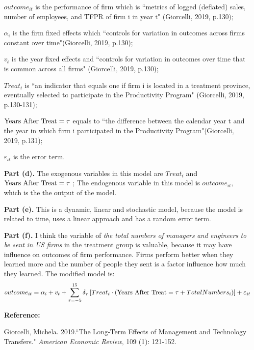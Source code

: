 \documentclass[letterpaper,12pt]{article}
\theoremstyle{definition}
\begin{document}
$outcome_{it}$ is the performance of firm which is ``metrics of logged (deflated) sales, number of employees, and TFPR of firm i in year t" (Giorcelli, 2019, p.130); 

$\alpha_{i} $ is the firm fixed effects which ``controls for variation in outcomes across firms constant over time"(Giorcelli, 2019, p.130); 

$ v_{t}$ is the year fixed effects and ``controls for variation in outcomes over time that is common across all firms" (Giorcelli, 2019, p.130); 

$Treat_{i}$ is ``an indicator that equals one if firm i is located in a treatment province, eventually selected to participate in the Productivity Program" (Giorcelli, 2019, p.130-131); 

$\textup{Years After Treat} = \tau$ equals to ``the difference between the calendar year t and the year in which firm i participated in the Productivity Program"(Giorcelli, 2019, p.131); 

$\varepsilon_{it}$ is the error term.

\textbf{Part (d).} The exogenous variables in this model are $Treat_{i}$  and $ \textup{Years After Treat} = \tau $  ; The endogenous variable in this model is $outcome_{it}$, which is the the output of the model.

\textbf{Part (e).} This is a dynamic, linear and stochastic model, because the model is related to time, uses a linear approach and has a random error term.

\textbf{Part (f).} I think the variable of \emph{the total numbers of managers and engineers to be sent in US firms} in the treatment group is valuable, because it may have influence on outcomes of firm performance. Firms perform better when they learned more and the number of people they sent is a factor influence how much they learned. The modified model is:
\begin{equation*}
 outcome_{it} = \alpha_{i} + v_{t} + \sum_{\tau =-5}^{15} \delta_{\tau }\left [ Treat_{i} \cdot \left ( \textup{Years After Treat} = \tau  + TotalNumbers_{i} \right ) \right ] + \varepsilon_{it}
\end{equation*}
 
\textbf{Reference:}

Giorcelli, Michela. 2019.``The Long-Term Effects of Management and Technology Transfers."  \emph{American Economic Review}, 109 (1): 121-152.

\vspace{5mm}
\end{document}
